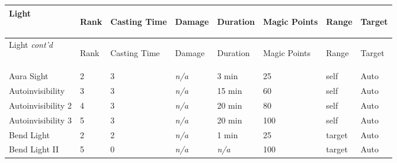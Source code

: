 \documentclass[twoside]{book}
\begin{document}
\begin{longtable}{p{1.25in}p{2em}p{1.5em}p{4em}p{4em}lp{4em}p{4em}} 
  Light& \begin{turn}{70}{Rank}\end{turn}
          & \begin{turn}{70}{Casting Time}\end{turn}
          & \begin{turn}{70}{Damage}\end{turn}
          & \begin{turn}{70}{Duration}\end{turn}
          & \begin{turn}{70}{Magic Points}\end{turn}
          & \begin{turn}{70}{Range}\end{turn}
          & \begin{turn}{70}{Target}\end{turn}
          \\
  \hline
  \hline
  \endfirsthead
  Light \textit{cont'd}
        & \begin{turn}{70}{Rank}\end{turn}
          & \begin{turn}{70}{Casting Time}\end{turn}
          & \begin{turn}{70}{Damage}\end{turn}
          & \begin{turn}{70}{Duration}\end{turn}
          & \begin{turn}{70}{Magic Points}\end{turn}
          & \begin{turn}{70}{Range}\end{turn}
          & \begin{turn}{70}{Target}\end{turn}
           \\
  \hline
  \endhead
\raggedright  Aura Sight& 2& 3&\textit{n/a}& 3 min& 25& self& Auto\tabularnewline
      \raggedright  Autoinvisibility& 3& 3&\textit{n/a}& 15 min& 60& self& Auto\tabularnewline
      \raggedright  Autoinvisibility 2& 4& 3&\textit{n/a}& 20 min& 80& self& Auto\tabularnewline
      \raggedright  Autoinvisibility 3& 5& 3&\textit{n/a}& 20 min& 100& self& Auto\tabularnewline
      \raggedright  Bend Light& 2& 2&\textit{n/a}& 1 min& 25& target& Auto\tabularnewline
      \raggedright  Bend Light II& 5& 0&\textit{n/a}&\textit{n/a}& 100& target& Auto\tabularnewline

\end{longtable}
\end{document}
